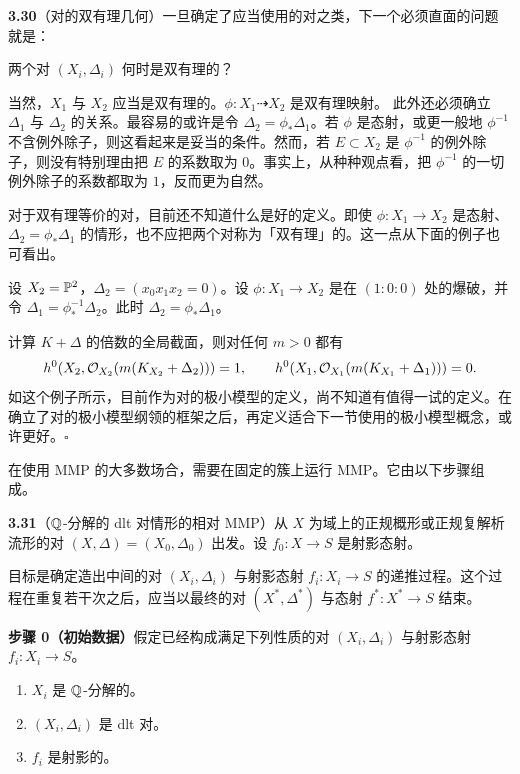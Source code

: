 \par\medskip\noindent\textbf{3.30}（对的双有理几何）\quad 一旦确定了应当使用的对之类，下一个必须直面的问题就是：

两个对 $(X_i,\Delta_i)$ 何时是双有理的？

当然，$X_1$ 与 $X_2$ 应当是双有理的。$\phi:X_1\dashrightarrow X_2$ 是双有理映射。
此外还必须确立 $\Delta_1$ 与 $\Delta_2$ 的关系。最容易的或许是令 $\Delta_2=\phi_*\Delta_1$。若 $\phi$ 是态射，或更一般地 $\phi^{-1}$ 不含例外除子，则这看起来是妥当的条件。然而，若 $E\subset X_2$ 是 $\phi^{-1}$ 的例外除子，则没有特别理由把 $E$ 的系数取为 $0$。事实上，从种种观点看，把 $\phi^{-1}$ 的一切例外除子的系数都取为 $1$，反而更为自然。

对于双有理等价的对，目前还不知道什么是好的定义。即使 $\phi:X_1\to X_2$ 是态射、$\Delta_2=\phi_*\Delta_1$ 的情形，也不应把两个对称为「双有理」的。这一点从下面的例子也可看出。

设 $X_2=\mathbb{P}^2$，$\Delta_2=(x_0x_1x_2=0)$。设 $\phi:X_1\to X_2$ 是在 $(1:0:0)$ 处的爆破，并令 $\Delta_1=\phi_*^{-1}\Delta_2$。此时 $\Delta_2=\phi_*\Delta_1$。

计算 $K+\Delta$ 的倍数的全局截面，则对任何 $m>0$ 都有
\[
h^0(X_2,\mathcal{O}_{X_2}(m(K_{X_2}+\Delta_2)))=1,\qquad
h^0(X_1,\mathcal{O}_{X_1}(m(K_{X_1}+\Delta_1)))=0.
\]
如这个例子所示，目前作为对的极小模型的定义，尚不知道有值得一试的定义。在确立了对的极小模型纲领的框架之后，再定义适合下一节使用的极小模型概念，或许更好。\hfill$\square$

在使用 MMP 的大多数场合，需要在固定的簇上运行 MMP。它由以下步骤组成。

\par\medskip\noindent\textbf{3.31}（$\mathbb{Q}$-分解的 dlt 对情形的相对 MMP）\quad 从 $X$ 为域上的正规概形或正规复解析流形的对 $(X,\Delta)=(X_0,\Delta_0)$ 出发。设 $f_0:X\to S$ 是射影态射。

目标是确定造出中间的对 $(X_i,\Delta_i)$ 与射影态射 $f_i:X_i\to S$ 的递推过程。这个过程在重复若干次之后，应当以最终的对 $(X^*,\Delta^*)$ 与态射 $f^*:X^*\to S$ 结束。

\par\medskip\noindent\textbf{步骤 0（初始数据）}\quad 假定已经构成满足下列性质的对 $(X_i,\Delta_i)$ 与射影态射 $f_i:X_i\to S$。
\begin{enumerate}[label=（\arabic*）,leftmargin=2.8em,itemsep=1pt,topsep=2pt,parsep=0pt]
\item $X_i$ 是 $\mathbb{Q}$-分解的。
\item $(X_i,\Delta_i)$ 是 dlt 对。
\item $f_i$ 是射影的。
\end{enumerate}

